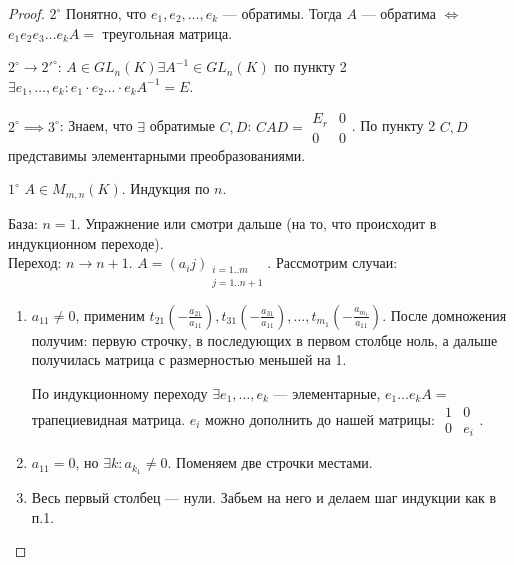\begin{proof}
    $2^\circ$ Понятно, что $e_1, e_2, \ldots, e_k$ --- обратимы. Тогда $A$ --- обратима  $\iff$  $e_1e_2e_3\ldots e_k A = $ треугольная матрица.

    $2^\circ \to 2'^\circ$:  $A \in GL_n(K) \exists A^{-1} \in GL_n(K)$ по пункту 2  $\exists e_1, \ldots, e_k\!: e_1 \cdot e_2 \ldots \cdot e_k A^{-1} = E$.

    $2^\circ \implies 3^\circ$: Знаем, что  $\exists$ обратимые  $C, D$:  $CAD = \begin{array}{|c|c|} E_r & 0 \\ \hline 0 & 0 \end{array}$. По пункту 2  $C, D$ представимы элементарными преобразованиями.

    $1^\circ$ $A \in M_{m, n}(K)$. Индукция по  $n$.

    База: $n = 1$. Упражнение или смотри дальше (на то, что происходит в индукционном переходе).\\
    Переход: $n \to n+1$.  $A = (a_ij)_{\substack{i = 1..m \\ j=1..{n+1}}}$. Рассмотрим случаи:
    \begin{enumerate}
        \item $a_{11} \neq 0$, применим $t_{21}(-\frac{a_{21}}{a_{11}}), t_{31}(-\frac{a_{31}}{a_{11}}),\ldots, t_{m_1}(-\frac{a_{m_1}}{a_{11}})$. После домножения получим: первую строчку, в последующих в первом столбце ноль, а дальше получилась матрица с размерностью меньшей на 1.

        По индукционному переходу $\exists e_1, \ldots, e_k$ --- элементарные, $e_1 \ldots e_k A = $ трапециевидная матрица. $e_i$ можно дополнить до нашей матрицы:  $\begin{array}{c|c} 1 & 0 \\ \hline 0 & e_i \end{array}$.

        \item $a_{11} = 0$, но $\exists k\!: a_{k_1} \neq 0$. Поменяем две строчки местами.

        \item Весь первый столбец --- нули. Забьем на него и делаем шаг индукции как в п.1.
    \end{enumerate}


\end{proof}
